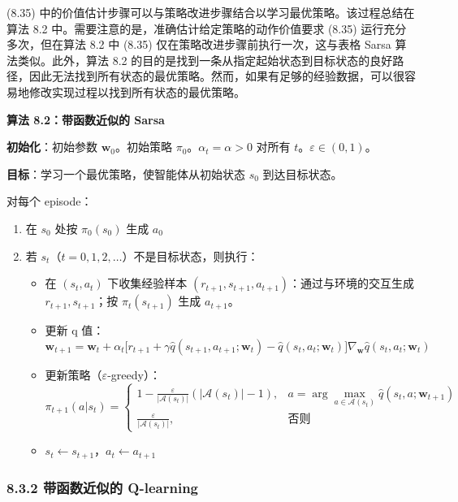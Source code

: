 \documentclass[UTF8]{article}
\begin{document}
(8.35) 中的价值估计步骤可以与策略改进步骤结合以学习最优策略。该过程总结在算法 8.2 中。需要注意的是，准确估计给定策略的动作价值要求 (8.35) 运行充分多次，但在算法 8.2 中 (8.35) 仅在策略改进步骤前执行一次，这与表格 Sarsa 算法类似。此外，算法 8.2 的目的是找到一条从指定起始状态到目标状态的良好路径，因此无法找到所有状态的最优策略。然而，如果有足够的经验数据，可以很容易地修改实现过程以找到所有状态的最优策略。

\begin{remarkbox}
\textbf{算法 8.2：带函数近似的 Sarsa}

\textbf{初始化}：初始参数 $\boldsymbol{w}_0$。初始策略 $\pi_0$。$\alpha_t = \alpha > 0$ 对所有 $t$。$\varepsilon \in (0, 1)$。

\textbf{目标}：学习一个最优策略，使智能体从初始状态 $s_0$ 到达目标状态。

对每个 episode：
\begin{enumerate}
    \item 在 $s_0$ 处按 $\pi_0(s_0)$ 生成 $a_0$
    \item 若 $s_t$（$t = 0, 1, 2, \dots$）不是目标状态，则执行：
    \begin{itemize}
        \item 在 $(s_t, a_t)$ 下收集经验样本 $(r_{t+1}, s_{t+1}, a_{t+1})$：通过与环境的交互生成 $r_{t+1}, s_{t+1}$；按 $\pi_t(s_{t+1})$ 生成 $a_{t+1}$。
        \item 更新 q 值：
        \[
        \boldsymbol{w}_{t+1} = \boldsymbol{w}_t + \alpha_t \big[r_{t+1} + \gamma \hat{q}(s_{t+1}, a_{t+1}; \boldsymbol{w}_t) - \hat{q}(s_t, a_t; \boldsymbol{w}_t)\big] \nabla_{\boldsymbol{w}} \hat{q}(s_t, a_t; \boldsymbol{w}_t)
        \]
        \item 更新策略（$\varepsilon$-greedy）：
        \[
        \pi_{t+1}(a|s_t) = 
        \begin{cases}
        1 - \frac{\varepsilon}{|\mathcal{A}(s_t)|}(|\mathcal{A}(s_t)|-1), & a = \arg\max_{a \in \mathcal{A}(s_t)} \hat{q}(s_t, a; \boldsymbol{w}_{t+1}) \\
        \frac{\varepsilon}{|\mathcal{A}(s_t)|}, & \text{否则}
        \end{cases}
        \]
        \item $s_t \leftarrow s_{t+1}$，$a_t \leftarrow a_{t+1}$
    \end{itemize}
\end{enumerate}
\end{remarkbox}

\subsubsection*{8.3.2 带函数近似的 Q-learning}
\end{document}
